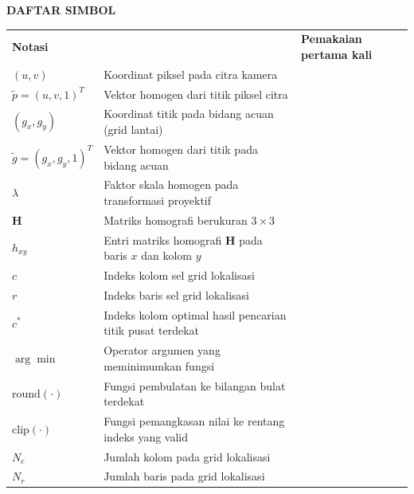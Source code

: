 \cleardoublepage
\vspace{2cm}
\begin{center}
{\fontsize{14}{16.8}\selectfont\textbf{DAFTAR SIMBOL}}\\[1em]
\end{center}
\label{chap:simbol}
\setcounter{chapter}{0}
\setcounter{section}{0}
\vspace{2em}




\begin{longtable}{@{} l >{\raggedright\arraybackslash}p{6.5cm} c @{}}
\multicolumn{1}{l}{\textbf{Notasi}} & \multicolumn{1}{l}{\textbf{Deskripsi}} & \multicolumn{1}{l}{\parbox[c]{3.5cm}{\raggedright \textbf{Pemakaian pertama kali}}} \\



$(u, v)$ & Koordinat piksel pada citra kamera & \pageref{eq:homografi-model} \\
$\tilde{p} = (u, v, 1)^T$ & Vektor homogen dari titik piksel citra & \pageref{eq:homografi-model} \\
$(g_x, g_y)$ & Koordinat titik pada bidang acuan (grid lantai) & \pageref{eq:homografi-model} \\
$\tilde{g} = (g_x, g_y, 1)^T$ & Vektor homogen dari titik pada bidang acuan & \pageref{eq:homografi-model} \\
$\lambda$ & Faktor skala homogen pada transformasi proyektif & \pageref{eq:homografi-model} \\
$\mathbf{H}$ & Matriks homografi berukuran $3 \times 3$ & \pageref{eq:homografi-model} \\
$h_{xy}$ & Entri matriks homografi $\mathbf{H}$ pada baris $x$ dan kolom $y$ & \pageref{eq:homografi-model} \\[1ex]

$c$ & Indeks kolom sel grid lokalisasi & \pageref{eq:sel-argmin} \\
$r$ & Indeks baris sel grid lokalisasi & \pageref{eq:sel-clip} \\
$c^\ast$ & Indeks kolom optimal hasil pencarian titik pusat terdekat & \pageref{eq:sel-argmin} \\
$\arg\min$ & Operator argumen yang meminimumkan fungsi & \pageref{eq:sel-argmin} \\
$\mathrm{round}(\cdot)$ & Fungsi pembulatan ke bilangan bulat terdekat & \pageref{eq:sel-argmin} \\
$\mathrm{clip}(\cdot)$ & Fungsi pemangkasan nilai ke rentang indeks yang valid & \pageref{eq:sel-clip} \\
$N_c$ & Jumlah kolom pada grid lokalisasi & \pageref{eq:sel-clip} \\
$N_r$ & Jumlah baris pada grid lokalisasi & \pageref{eq:sel-clip} \\

\end{longtable}
